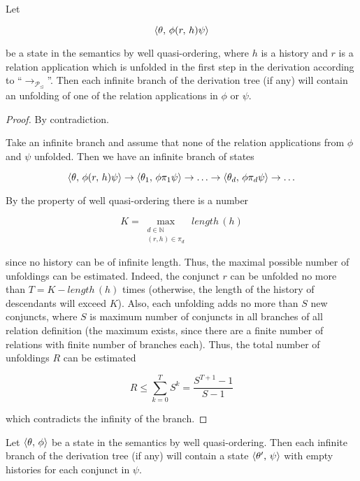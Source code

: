 \begin{lemma}
  \label{lem:one-step-liveness}
  Let

  \[
  \langle \theta,\, \phi (r,\, h) \psi \rangle
  \]

  be a state in the semantics by well quasi-ordering, where $h$ is a history and $r$ is a relation application which
  is unfolded in the first step in the derivation according to  ``$\rightarrow_{\mathcal{P}_\trianglelefteq}$''. Then each infinite branch
  of the derivation tree (if any) will contain an unfolding of one of the relation applications in $\phi$ or $\psi$.
\end{lemma}
\begin{proof}
By contradiction.

Take an infinite branch and assume that none of the relation applications from $\phi$ and $\psi$ unfolded.
Then we have an infinite branch of states

     \[   
     \langle \theta,\, \phi (r,\, h) \psi \rangle \rightarrow \langle \theta_1,\, \phi \pi_1 \psi \rangle \rightarrow \ldots \rightarrow \langle \theta_d,\, \phi \pi_d \psi \rangle \rightarrow \ldots
     \]      
        
By the property of well quasi-ordering there is a number

   \[
   K = \max_{\substack{d\in\mathbb{N}\\(r,h) \in \pi_d}}\,length\,(h)
   \]

since no history can be of infinite length. Thus, the maximal possible number of unfoldings can be estimated. Indeed,
the conjunct $r$ can be unfolded no more than $T = K - length\,(h)$ times (otherwise, the length of the history
of descendants will exceed $K$). Also, each unfolding adds no more than $S$ new conjuncts, where $S$ is maximum
number of conjuncts in all branches of all relation definition (the maximum exists, since there are a finite number of relations with
finite number of branches each). Thus, the total number of unfoldings $R$ can be estimated

    \[
    R \le \sum_{k=0}^{T}S^k = \frac{S^{T + 1} - 1}{S - 1}
    \]  
        
    which contradicts the infinity of the branch.
\end{proof}

\begin{lemma}
  \label{lem:histories-devastation}
  Let $\langle \theta,\, \phi \rangle$ be a state in the semantics by well quasi-ordering. Then each infinite branch of the derivation tree (if any)
  will contain a state $\langle \theta^\prime,\, \psi \rangle$ with empty histories for each conjunct in $\psi$.
\end{lemma}

